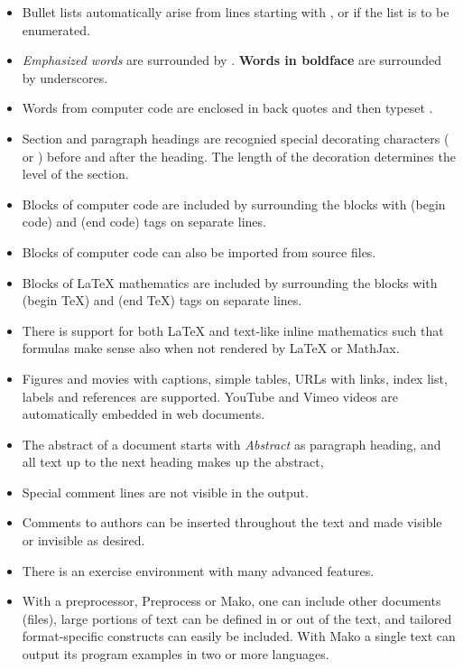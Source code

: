 \documentclass[%
oneside,                 %
final,                   %
10pt]{article}
\begin{document}
\begin{itemize}
  \item Bullet lists automatically arise from lines starting with \code{*},
    or  if the list is to be enumerated.

  \item \emph{Emphasized words} are surrounded by \code{*}. \textbf{Words in boldface}
    are surrounded by underscores.

  \item Words from computer code are enclosed in back quotes and
    then typeset .

  \item Section and paragraph headings are recognied special
    decorating characters (\code{=} or \code{_}) before and after the heading.
    The length of the decoration determines the level of the
    section.

  \item Blocks of computer code are included by surrounding the blocks with
     (begin code) and  (end code) tags on separate lines.

  \item Blocks of computer code can also be imported from source files.

  \item Blocks of {\LaTeX} mathematics are included by surrounding the blocks
    with  (begin TeX) and  (end TeX) tags on separate lines.

  \item There is support for both {\LaTeX} and text-like inline mathematics
    such that formulas make sense also when not rendered by {\LaTeX}
    or MathJax.

  \item Figures and movies with captions, simple tables,
    URLs with links, index list, labels and references are supported.
    YouTube and Vimeo videos are automatically embedded in web documents.

  \item The abstract of a document starts with \emph{Abstract} as paragraph
    heading, and all text up to the next heading makes up the abstract,

  \item Special comment lines are not visible in the output.

  \item Comments to authors can be inserted throughout the text and
    made visible or invisible as desired.

  \item There is an exercise environment with many advanced features.

  \item With a preprocessor, Preprocess or Mako, one can include other
    documents (files), large portions of text can be defined in or out
    of the text, and tailored format-specific constructs can easily be
    included. With Mako a single text can output its program examples
    in two or more languages.
\end{itemize}
\end{document}
